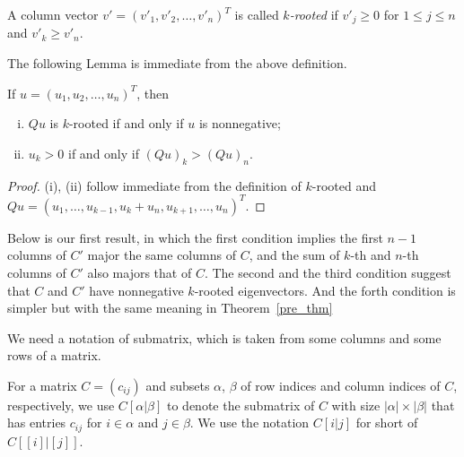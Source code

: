 \documentclass{beamer}
\begin{document}
\begin{frame}
    \begin{definition}%
        A column vector $v'=(v'_1,v'_2,\ldots,v'_n)^T$ is called {\it $k$-rooted} if $v'_{j} \geq 0$ for $1 \leq  j \leq n$ and $v'_k\geq v'_n$.
        \end{definition}
        
        The following Lemma is immediate from the above definition.
        
        \begin{lemma}\label{lem:rt_vec}
        If $u=(u_1, u_2, \ldots, u_n)^T$, then
        \begin{enumerate}[(i)]
        \item \label{lem:rt_vec:en1} $Qu$ is $k$-rooted  if and only if $u$ is nonnegative;
        \item $u_k>0$ if and only if $(Qu)_k>(Qu)_n$.
        \end{enumerate}
        \end{lemma}
\end{frame}

\begin{frame}
    \begin{proof}
        (i), (ii) follow immediate from the definition of $k$-rooted and
         $Qu=(u_1,\ldots, u_{k-1},u_k+u_n, u_{k+1}, \ldots,  u_n)^T$.
        \end{proof}
        
        Below is our first result, in which the first condition implies the first $n-1$ columns of $C'$ major
         the same columns of $C$, and the sum of $k$-th and $n$-th columns of $C'$ also majors that of $C$. The second and the third condition
         suggest that $C$ and $C'$ have nonnegative $k$-rooted eigenvectors. And the forth condition is simpler
          but with the same meaning in Theorem~\ref{pre_thm} 
\end{frame}

\begin{frame}
    We need a notation of submatrix, which is taken from some columns and some rows of a matrix.

\begin{definition}
    For a matrix $C=(c_{ij})$ and subsets $\alpha$, $\beta$ of row indices and column
    indices of $C$, respectively, we use $C[\alpha|\beta]$ to denote the
    submatrix of $C$ with size $ |\alpha| \times |\beta| $ that has entries $c_{ij}$ for $i\in \alpha$
    and $j\in\beta$. We use the notation $C[i|j]$ for short of $C[[i]|[j]].$
\end{definition}
\end{frame}
\end{document}

